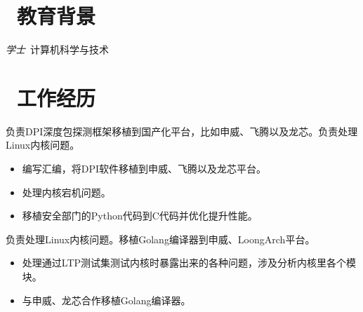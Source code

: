 \documentclass{resume}
\begin{document}


 
\section{\faGraduationCap\  教育背景}
\textit{学士}\ 计算机科学与技术

\section{\faUsers\ 工作经历}
\begin{onehalfspacing}
  负责DPI深度包探测框架移植到国产化平台，比如申威、飞腾以及龙芯。负责处理Linux内核问题。
  \begin{itemize}
  \item 编写汇编，将DPI软件移植到申威、飞腾以及龙芯平台。
  \item 处理内核宕机问题。
  \item 移植安全部门的Python代码到C代码并优化提升性能。
  \end{itemize}
\end{onehalfspacing}

\begin{onehalfspacing}
  负责处理Linux内核问题。移植Golang编译器到申威、LoongArch平台。
  \begin{itemize}
  \item 处理通过LTP测试集测试内核时暴露出来的各种问题，涉及分析内核里各个模块。
  \item 与申威、龙芯合作移植Golang编译器。
  \end{itemize}
\end{onehalfspacing}
\end{document}
